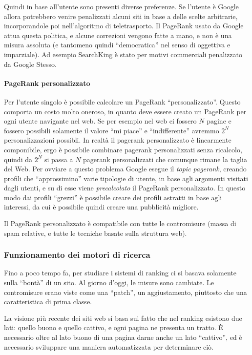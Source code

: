 Quindi in base all'utente sono presenti diverse preferenze. Se l'utente \`e Google allora potrebbero venire penalizzati alcuni siti in base a delle scelte arbitrarie, incorporandole poi nell'algoritmo di teletrasporto. Il PageRank usato da Google attua questa politica, e alcune correzioni vengono fatte a mano, e non \`e una misura assoluta (e tantomeno quindi ``democratica'' nel senso di oggettiva e imparziale). Ad esempio SearchKing \`e stato per motivi commerciali penalizzato da Google Stesso.

\paragraph*{PageRank personalizzato}Per l'utente singolo \`e possibile calcolare un PageRank ``personalizzato''. Questo comporta un costo molto oneroso, in quanto deve essere creato un PageRank per ogni utente navigante nel web. Se per esempio nel web ci fossero $N$ pagine e fossero possibili solamente il valore ``mi piace'' e ``indifferente'' avremmo $2^N $ personalizzazioni possibli. In realt\`a il pagerank personalizzato \`e linearmente componibile, ergo \`e possibile combinare pagerank personalizzati senza ricalcolo, quindi da $2^N $ si passa a $N$ pagerank personalizzati che comunque rimane la taglia del Web. Per ovviare a questo problema Google esegue il \textit{topic pagerank}, creando profili che ``approssimino'' varie tipologie di utente, in base agli argomenti visitati dagli utenti, e su di esse viene \textit{precalcolato} il PageRank personalizzato. In questo modo dai profili ``grezzi'' \`e possibile creare dei profili astratti in base agli interessi, da cui \`e possibile quindi creare una pubblicit\`a migliore.

Il PageRank personalizzato \`e compatibile con tutte le contromisure (massa di spam relative, e tutte le tecniche basate sulla struttura web).


\subsubsection{Funzionamento dei motori di ricerca}

Fino a poco tempo fa, per studiare i sistemi di ranking ci si basava solamente sulla ``bont\`a'' di un sito. Al giorno d'oggi, le misure sono cambiate. Le contromisure erano viste come una ``patch'', un aggiustamento, piuttosto che una caratteristica di prima classe.

La visione pi\`u recente dei siti web si basa sul fatto che nel ranking esistono due lati: quello buono e quello cattivo, e ogni pagina ne presenta un tratto.
\`E necessario oltre al lato buono di una pagina darne anche un lato ``cattivo'', ed \`e necessario sviluppare una maniera automatizzata per determinare ci\`o.

